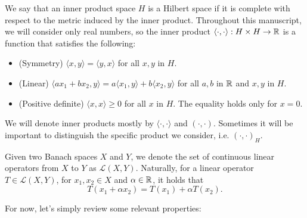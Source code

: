 \begin{definition}
    We say that an inner product space $H$ is a Hilbert space if it is complete with respect to the metric induced by the inner product. Throughout this manuscript, we will consider only real numbers, so the inner product $\langle\cdot, \cdot\rangle: H\times H \to \mathbb{R}$ is a function that satisfies the following: 
    \begin{itemize}
        \item (Symmetry) $\langle x,y\rangle = \langle y,x\rangle$ for all $x,y$ in $H$.
        \item (Linear) $\langle ax_1 + bx_2, y\rangle = a\langle x_1, y\rangle + b\langle x_2, y\rangle$ for all $a,b$ in $\mathbb{R}$ and $x,y$ in $H$. 
        \item (Positive definite) $\langle x, x\rangle \geq 0$ for all $x$ in $H$. The equality holds only for $x=0$. 
    \end{itemize}
    We will denote inner products mostly by $\langle\cdot, \cdot\rangle$ and $(\cdot, \cdot)$. Sometimes it will be important to distinguish the specific product we consider, i.e. $(\cdot, \cdot)_H$. 
\end{definition}
\begin{definition}
    Given two Banach spaces $X$ and $Y$, we denote the set of continuous linear operators from $X$ to $Y$ as $\mathcal{L}(X,Y)$. Naturally, for a linear operator $T\in \mathcal{L}(X,Y)$, for $x_1,x_2\in X$ and $\alpha\in\mathbb{R}$, it holds that 
    \begin{equation*}
        T(x_1+\alpha x_2) = T(x_1) + \alpha T(x_2).
    \end{equation*}
\end{definition}
For now, let's simply review some relevant properties: 
